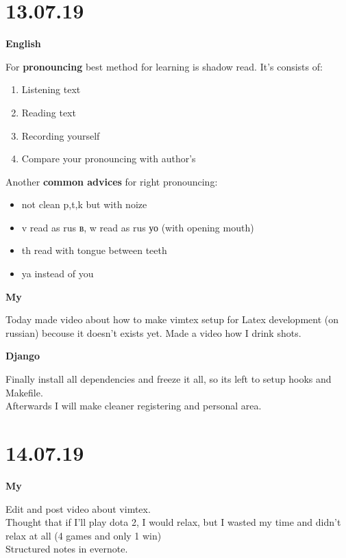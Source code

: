 \documentclass[12pt,a4paper,titlepage]{article}
\begin{document}
\newpage
\section{13.07.19}

\begin{center}
    \large \textbf{English}
\end{center}
For \textbf{pronouncing} best method for learning is shadow read. It's consists of:
\begin{enumerate}
    \item{Listening text}
    \item{Reading text}
    \item{Recording yourself}
    \item{Compare your pronouncing with author's}
\end{enumerate}
Another \textbf{common advices} for right pronouncing:
\begin{itemize}
    \item{not clean p,t,k but with noize}
    \item{v read as rus в, w read as rus уо (with opening mouth)}
    \item{th read with tongue between teeth}
    \item{ya instead of you}
\end{itemize}

\begin{center}
    \large \textbf{My}
\end{center}
Today made video about how to make vimtex setup for Latex development (on russian) becouse it doesn't exists yet.
Made a video how I drink shots.

\begin{center}
    \large \textbf{Django}
\end{center}
Finally install all dependencies and freeze it all, so its left to setup hooks and Makefile. \\
Afterwards I will make cleaner registering and personal area.

\newpage
\section{14.07.19}

\begin{center}
    \large \textbf{My}
\end{center}
Edit and post video about vimtex.\\
Thought that if I'll play dota 2, I would relax, but I wasted my time and didn't relax at all (4 games and only 1 win)\\
Structured notes in evernote.
\end{document}
